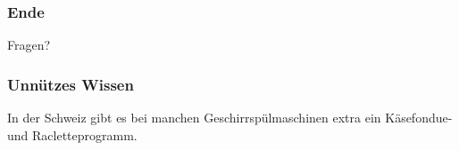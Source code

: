 \documentclass{beamer}
\begin{document}
\begin {frame}
\frametitle {Ende}
	\begin {center}
		Fragen?
	\end {center}
\end {frame}

\begin {frame}
\frametitle {Unnützes Wissen}
	\begin {center}
		In der Schweiz gibt es bei manchen Geschirrspülmaschinen extra ein Käsefondue- und Racletteprogramm.
	\end {center}
\end {frame}
\end{document}
